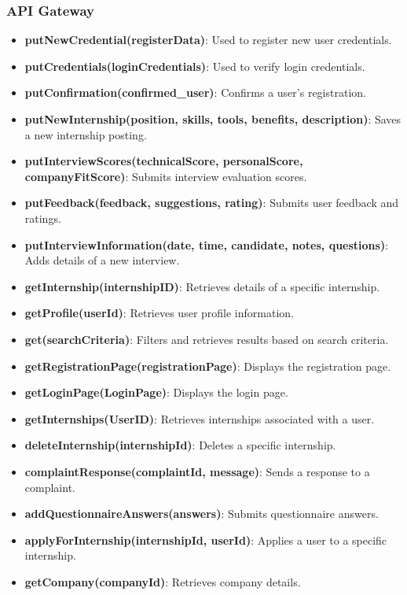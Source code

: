\subsubsection{API Gateway}
\begin{itemize}
    \item \textbf{putNewCredential(registerData)}: Used to register new user credentials.
    \item \textbf{putCredentials(loginCredentials)}: Used to verify login credentials.
    \item \textbf{putConfirmation(confirmed\_user)}: Confirms a user's registration.
    \item \textbf{putNewInternship(position, skills, tools, benefits, description)}: Saves a new internship posting.
    \item \textbf{putInterviewScores(technicalScore, personalScore, companyFitScore)}: Submits interview evaluation scores.
    \item \textbf{putFeedback(feedback, suggestions, rating)}: Submits user feedback and ratings.
    \item \textbf{putInterviewInformation(date, time, candidate, notes, questions)}: Adds details of a new interview.
    \item \textbf{getInternship(internshipID)}: Retrieves details of a specific internship.
    \item \textbf{getProfile(userId)}: Retrieves user profile information.
    \item \textbf{get(searchCriteria)}: Filters and retrieves results based on search criteria.
    \item \textbf{getRegistrationPage(registrationPage)}: Displays the registration page.
    \item \textbf{getLoginPage(LoginPage)}: Displays the login page.
    \item \textbf{getInternships(UserID)}: Retrieves internships associated with a user.
    \item \textbf{deleteInternship(internshipId)}: Deletes a specific internship.
    \item \textbf{complaintResponse(complaintId, message)}: Sends a response to a complaint.
    \item \textbf{addQuestionnaireAnswers(answers)}: Submits questionnaire answers.
    \item \textbf{applyForInternship(internshipId, userId)}: Applies a user to a specific internship.
    \item \textbf{getCompany(companyId)}: Retrieves company details.

\end{itemize}

